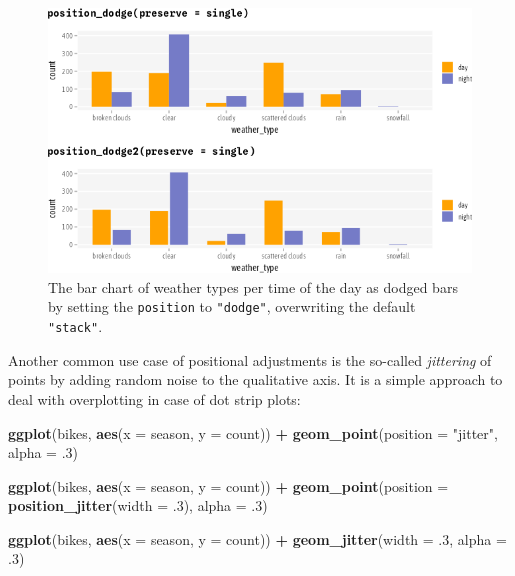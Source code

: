 \documentclass[
]{krantz}
\makeatletter
\newenvironment{Shaded}{\begin{snugshade}}{\end{snugshade}}
\newcommand{\AttributeTok}[1]{\textcolor[rgb]{0.27,0.27,0.27}{#1}}
\newcommand{\DecValTok}[1]{\textcolor[rgb]{0.06,0.06,0.06}{#1}}
\newcommand{\FunctionTok}[1]{\textcolor[rgb]{0.27,0.27,0.27}{\textbf{#1}}}
\newcommand{\NormalTok}[1]{#1}
\newcommand{\SpecialCharTok}[1]{\textcolor[rgb]{0.43,0.43,0.43}{\textbf{#1}}}
\newcommand{\StringTok}[1]{\textcolor[rgb]{0.5,0.5,0.5}{#1}}
\newenvironment{kframe}{%
\medskip{}
\setlength{\fboxsep}{.8em}
 \def\at@end@of@kframe{}%
 \ifinner\ifhmode%
  \def\at@end@of@kframe{\end{minipage}}%
  \begin{minipage}{\columnwidth}%
 \fi\fi%
 \def\FrameCommand##1{\hskip\@totalleftmargin \hskip-\fboxsep
 \colorbox{shadecolor}{##1}\hskip-\fboxsep
     \hskip-\linewidth \hskip-\@totalleftmargin \hskip\columnwidth}%
 \MakeFramed {\advance\hsize-\width
   \@totalleftmargin\z@ \linewidth\hsize
   \@setminipage}}%
 {\par\unskip\endMakeFramed%
 \at@end@of@kframe}
\renewenvironment{Shaded}{\begin{kframe}}{\end{kframe}}
\makeatother
\begin{document}
\begin{figure}
\centering
\includegraphics{bookdown_files/figure-latex/07layerPredefinedCustomBarsDodgeVars-1.png}
\caption{\label{fig:07layerPredefinedCustomBarsDodgeVars}The bar chart of weather types per time of the day as dodged bars by setting the \texttt{position} to \texttt{"dodge"}, overwriting the default \texttt{"stack"}.}
\end{figure}

Another common use case of positional adjustments is the so-called \emph{jittering} of points by adding random noise to the qualitative axis. It is a simple approach to deal with overplotting in case of dot strip plots:

\begin{Shaded}
\begin{Highlighting}[]
\FunctionTok{ggplot}\NormalTok{(bikes, }\FunctionTok{aes}\NormalTok{(}\AttributeTok{x =}\NormalTok{ season, }\AttributeTok{y =}\NormalTok{ count)) }\SpecialCharTok{+}
  \FunctionTok{geom\_point}\NormalTok{(}\AttributeTok{position =} \StringTok{"jitter"}\NormalTok{, }\AttributeTok{alpha =}\NormalTok{ .}\DecValTok{3}\NormalTok{)}

\FunctionTok{ggplot}\NormalTok{(bikes, }\FunctionTok{aes}\NormalTok{(}\AttributeTok{x =}\NormalTok{ season, }\AttributeTok{y =}\NormalTok{ count)) }\SpecialCharTok{+}
  \FunctionTok{geom\_point}\NormalTok{(}\AttributeTok{position =} \FunctionTok{position\_jitter}\NormalTok{(}\AttributeTok{width =}\NormalTok{ .}\DecValTok{3}\NormalTok{), }\AttributeTok{alpha =}\NormalTok{ .}\DecValTok{3}\NormalTok{)}

\FunctionTok{ggplot}\NormalTok{(bikes, }\FunctionTok{aes}\NormalTok{(}\AttributeTok{x =}\NormalTok{ season, }\AttributeTok{y =}\NormalTok{ count)) }\SpecialCharTok{+}
  \FunctionTok{geom\_jitter}\NormalTok{(}\AttributeTok{width =}\NormalTok{ .}\DecValTok{3}\NormalTok{, }\AttributeTok{alpha =}\NormalTok{ .}\DecValTok{3}\NormalTok{)}
\end{Highlighting}
\end{Shaded}
\end{document}
